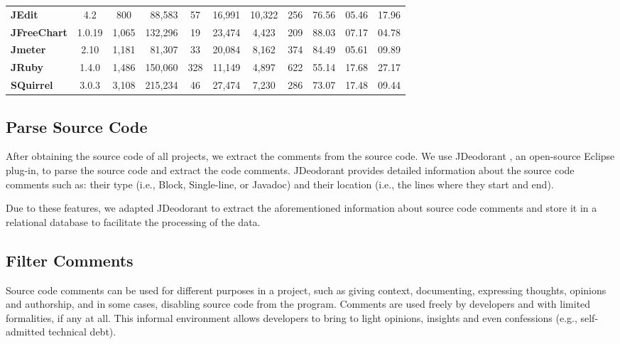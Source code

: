 \begin{table}[thb!]
\begin{center}
\begin{tabular}{l| c c r c || c c c || c c c}
            \textbf{JEdit}          & 4.2      &   800 &  88,583 & 57  & 16,991 &  10,322 &    256 &  76.56  & 05.46  & 17.96 \\
            \textbf{JFreeChart}     & 1.0.19   & 1,065 & 132,296 & 19  & 23,474 &   4,423 &    209 &  88.03  & 07.17  & 04.78 \\
            \textbf{Jmeter}         & 2.10     & 1,181 &  81,307 & 33  & 20,084 &   8,162 &    374 &  84.49  & 05.61  & 09.89 \\
            \textbf{JRuby}          & 1.4.0    & 1,486 & 150,060 & 328 & 11,149 &   4,897 &    622 &  55.14  & 17.68  & 27.17 \\ 
            \textbf{SQuirrel}       & 3.0.3    & 3,108 & 215,234 & 46  & 27,474 &   7,230 &    286 &  73.07  & 17.48  & 09.44 \\ 
            \bottomrule             
        \end{tabular}
    \end{center}
\end{table}


\subsection{Parse Source Code} %
\label{sub:parse_source_code}

After obtaining the source code of all projects, we extract the comments from the source code. We use JDeodorant \cite{Tsantalis2008CSMR}, an open-source Eclipse plug-in, to parse the source code and extract the code comments. JDeodorant provides detailed information about the source code comments such as: their type (i.e., Block, Single-line, or Javadoc) and their location (i.e., the lines where they start and end).  

Due to these features, we adapted JDeodorant to extract the aforementioned information about source code comments and store it in a relational database to facilitate the processing of the data. 

\subsection{Filter Comments} %
\label{sub:filter_comments}

Source code comments can be used for different purposes in a project, such as giving context, documenting, expressing thoughts, opinions and authorship, and in some cases, disabling source code from the program. Comments are used freely by developers and with limited formalities, if any at all. This informal environment allows developers to bring to light opinions, insights and even confessions (e.g., self-admitted technical debt). 

